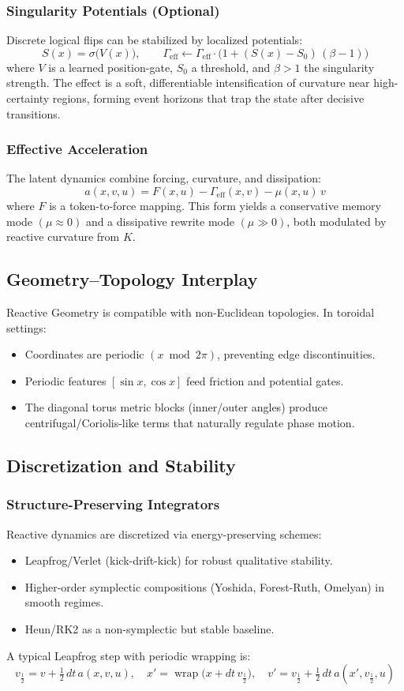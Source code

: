 \documentclass{article}
\numberwithin{equation}{section}
\begin{document}
\subsubsection{Singularity Potentials (Optional)}
Discrete logical flips can be stabilized by localized potentials:
\[
S(x) = \sigma\!\big(V(x)\big),\qquad
\Gamma_{\text{eff}} \leftarrow \Gamma_{\text{eff}}\cdot\!\big(1+(S(x)-S_0)\,(\beta-1)\big)
\]
where $V$ is a learned position-gate, $S_0$ a threshold, and $\beta>1$ the singularity strength. The effect is a soft, differentiable intensification of curvature near high-certainty regions, forming event horizons that trap the state after decisive transitions.

\subsubsection{Effective Acceleration}
The latent dynamics combine forcing, curvature, and dissipation:
\[
a(x,v,u) = F(x,u) - \Gamma_{\text{eff}}(x,v) - \mu(x,u)\,v
\]
where $F$ is a token-to-force mapping. This form yields a conservative memory mode $(\mu\approx 0)$ and a dissipative rewrite mode $(\mu\gg 0)$, both modulated by reactive curvature from $K$.

\subsection{Geometry–Topology Interplay}
Reactive Geometry is compatible with non-Euclidean topologies. In toroidal settings:
\begin{itemize}
\item Coordinates are periodic $(x\bmod 2\pi)$, preventing edge discontinuities.
\item Periodic features $[\sin x,\cos x]$ feed friction and potential gates.
\item The diagonal torus metric blocks (inner/outer angles) produce centrifugal/Coriolis-like terms that naturally regulate phase motion.
\end{itemize}

\subsection{Discretization and Stability}
\subsubsection{Structure-Preserving Integrators}
Reactive dynamics are discretized via energy-preserving schemes:
\begin{itemize}
\item Leapfrog/Verlet (kick-drift-kick) for robust qualitative stability.
\item Higher-order symplectic compositions (Yoshida, Forest-Ruth, Omelyan) in smooth regimes.
\item Heun/RK2 as a non-symplectic but stable baseline.
\end{itemize}
A typical Leapfrog step with periodic wrapping is:
\[
v_{\tfrac12}=v+\tfrac12\,dt\,a(x,v,u),\quad
x'=\operatorname{wrap}\!\big(x+dt\,v_{\tfrac12}\big),\quad
v'=v_{\tfrac12}+\tfrac12\,dt\,a(x',v_{\tfrac12},u)
\]
\end{document}
